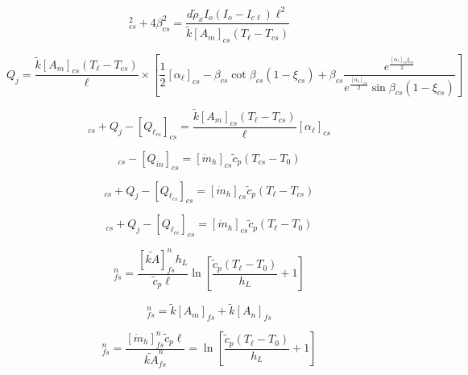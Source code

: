 \begin{equation}
[\alpha_\ell]_{cs}^{2}+4\beta_{cs}^{2}=\frac{d\tilde{\rho}_xI_o(I_o-I_{c\ell})\ell^2}{\tilde{k}[A_m]_{cs}(T_\ell-T_{cs})}
\end{equation}

\begin{equation}
Q_j=\frac{\tilde{k}[A_m]_{cs}(T_\ell-T_{cs})}{\ell}
\times\left[\frac{1}{2}[\alpha_\ell]_{cs}-\beta_{cs}\cot\beta_{cs}(1-\xi_{cs})+\beta_{cs}\frac{e^{\frac{[\alpha_\ell]_{cs}\xi_{cs}}{2}}}{e^{\frac{[\alpha_\ell]_{cs}}{2}}\sin\beta_{cs}(1-\xi_{cs})}\right]
\end{equation}

\begin{equation}
[Q_\ell]_{cs}+Q_j-[Q_{\ell_{cs}}]_{cs}=\frac{\tilde{k}[A_m]_{cs}(T_\ell-T_{cs})}{\ell}[\alpha_\ell]_{cs}
\end{equation}

\begin{equation}%
[Q_{\ell_{cs}}]_{cs}-[Q_{in}]_{cs}=[\dot{m}_h]_{cs}\tilde{c}_p(T_{cs}-T_0)
\end{equation}

\begin{equation}%
[Q_\ell]_{cs}+Q_j-[Q_{\ell_{cs}}]_{cs}=[\dot{m}_h]_{cs}\tilde{c}_p(T_\ell-T_{cs})
\end{equation}

\begin{equation}%
[Q_\ell]_{cs}+Q_j-[Q_{\ell_{cs}}]_{cs}=[\dot{m}_h]_{cs}\tilde{c}_p(T_\ell-T_0)
\end{equation}

\begin{equation}%
[Q_{in}]_{fs}^{n}=\frac{[\tilde{kA}]_{fs}^{n}h_L}{\tilde{c}_p\ell}\ln\left[\frac{\tilde{c}_p(T_\ell-T_0)}{h_L}+1\right]
\end{equation}

\begin{equation}%
[\tilde{kA}]_{fs}^{n}=\tilde{k}[A_m]_{fs}+\tilde{k}[A_n]_{fs}
\end{equation}

\begin{equation}%
[\alpha_\ell]_{fs}^{n}=\frac{[\dot{m}_h]_{fs}^{n}\tilde{c}_p\ell}{\tilde{kA}_{fs}^{n}} 
=\ln\left[\frac{\tilde{c}_p(T_\ell-T_0)}{h_L}+1\right]
\end{equation}

